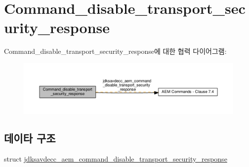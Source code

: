 \hypertarget{group__command__disable__transport__security__response}{}\section{Command\+\_\+disable\+\_\+transport\+\_\+security\+\_\+response}
\label{group__command__disable__transport__security__response}
Command\+\_\+disable\+\_\+transport\+\_\+security\+\_\+response에 대한 협력 다이어그램\+:
\nopagebreak
\begin{figure}[H]
\begin{center}
\leavevmode
\includegraphics[width=350pt]{group__command__disable__transport__security__response}
\end{center}
\end{figure}
\subsection*{데이타 구조}
\begin{DoxyCompactItemize}
\item 
struct \hyperlink{structjdksavdecc__aem__command__disable__transport__security__response}{jdksavdecc\+\_\+aem\+\_\+command\+\_\+disable\+\_\+transport\+\_\+security\+\_\+response}
\end{DoxyCompactItemize}
